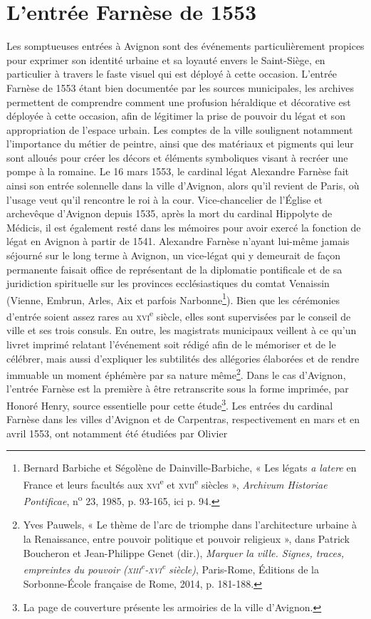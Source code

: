 \documentclass[12pt,twoside,openany]{book}
\begin{document}
\section{L’entrée Farnèse de 1553}

Les somptueuses entrées à Avignon sont des événements particulièrement propices pour exprimer son identité urbaine et sa loyauté envers le Saint-Siège, en particulier à travers le faste visuel qui est déployé à cette occasion. L’entrée Farnèse de 1553 étant bien documentée par les sources municipales, les archives permettent de comprendre comment une profusion héraldique et décorative est déployée à cette occasion, afin de légitimer la prise de pouvoir du légat et son appropriation de l’espace urbain. Les comptes de la ville soulignent notamment l’importance du métier de peintre, ainsi que des matériaux et pigments qui leur sont alloués pour créer les décors et éléments symboliques visant à recréer une pompe à la romaine. Le 16 mars 1553, le cardinal légat Alexandre Farnèse fait ainsi son entrée solennelle dans la ville d’Avignon, alors qu’il revient de Paris, où l’usage veut qu’il rencontre le roi à la cour. Vice-chancelier de l’Église et archevêque d’Avignon depuis 1535, après la mort du cardinal Hippolyte de Médicis, il est également resté dans les mémoires pour avoir exercé la fonction de légat en Avignon à partir de 1541. Alexandre Farnèse n’ayant lui-même jamais séjourné sur le long terme à Avignon, un vice-légat qui y demeurait de façon permanente faisait office de représentant de la diplomatie pontificale et de sa juridiction spirituelle sur les provinces ecclésiastiques du comtat Venaissin (Vienne, Embrun, Arles, Aix et parfois Narbonne\footnote{Bernard Barbiche et Ségolène de Dainville-Barbiche, « Les légats \textit{a latere} en France et leurs facultés aux \textsc{xvi}\textsuperscript{e} et \textsc{xvii}\textsuperscript{e} siècles », \textit{Archivum Historiae Pontificae}, n\textsuperscript{o} 23, 1985, p. 93-165, ici p. 94.}). Bien que les cérémonies d’entrée soient assez rares au \textsc{xvi}\textsuperscript{e} siècle, elles sont supervisées par le conseil de ville et ses trois consuls. En outre, les magistrats municipaux veillent à ce qu’un livret imprimé relatant l’événement soit rédigé afin de le mémoriser et de le célébrer, mais aussi d’expliquer les subtilités des allégories élaborées et de rendre immuable un moment éphémère par sa nature même\footnote{Yves Pauwels, « Le thème de l’arc de triomphe dans l’architecture urbaine à la Renaissance, entre pouvoir politique et pouvoir religieux », dans Patrick Boucheron et Jean-Philippe Genet (dir.), \textit{Marquer la ville. Signes, traces, empreintes du pouvoir (}\textit{\textsc{xiii}}\textit{\textsuperscript{e}}\textit{-}\textit{\textsc{xvi}}\textit{\textsuperscript{e}}\textit{ siècle)}, Paris-Rome, Éditions de la Sorbonne-École française de Rome, 2014, p. 181-188.}. Dans le cas d’Avignon, l’entrée Farnèse est la première à être retranscrite sous la forme imprimée, par Honoré Henry, source essentielle pour cette étude\footnote{La page de couverture présente les armoiries de la ville d’Avignon.}. Les entrées du cardinal Farnèse dans les villes d’Avignon et de Carpentras, respectivement en mars et en avril 1553, ont notamment été étudiées par Olivier 
\end{document}
